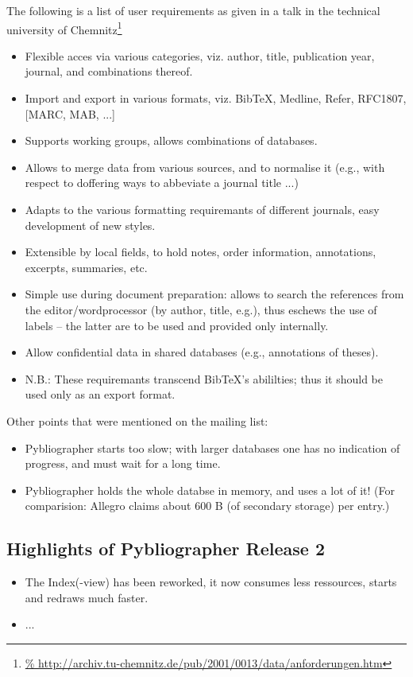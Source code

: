 The following is a list of user requirements as given in a talk in the
technical university of Chemnitz\footnote{\url{%
    http://archiv.tu-chemnitz.de/pub/2001/0013/data/anforderungen.htm}} 
\begin{itemize}

\item Flexible acces via various categories, viz. author, title,
  publication year, journal, and combinations thereof.

\item Import and export in various formats, viz. BibTeX, Medline,
  Refer, RFC1807, [MARC, MAB, ...]

\item Supports working groups, allows combinations of databases.

\item Allows to merge data from various sources, and to normalise it
  (e.g., with respect to doffering ways to abbeviate a journal title ...)

\item Adapts to the various formatting requiremants of different
  journals, easy development of new styles.

\item Extensible by local fields, to hold notes, order information,
  annotations, excerpts, summaries, etc.

\item Simple use during document preparation: allows to search the
  references from the editor/wordprocessor (by author, title, e.g.),
  thus eschews the use of labels -- the latter are to be used and
  provided only internally. 

\item Allow confidential data in shared databases (e.g., annotations
  of theses).

\item N.B.: These requiremants transcend BibTeX's abililties; thus it
  should be used only as an export format.
\end{itemize}

Other points that were mentioned on the mailing list:
\begin{itemize}
\item Pybliographer starts too slow; with larger databases one has no
  indication of progress, and must wait for a long time. 
\item Pybliographer holds the whole databse in memory, and uses a lot
  of it! (For comparision: Allegro claims about 600 B (of secondary
  storage) per entry.)

\end{itemize}




\subsection{Highlights of Pybliographer Release 2}
\label{sec:highr2}

\begin{itemize}
\item The Index(-view) has been reworked, it now consumes less ressources,
  starts and redraws much faster.
\item ...
\end{itemize}



